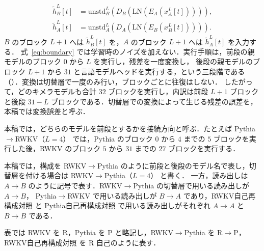 \documentclass[techrep,noauthor]{ipsj}
\newcommand{\rev}[1]{{\color{blue}#1}}
\newcommand{\revr}[1]{{\color{red}#1}}
\newcommand{\revp}[1]{{\color{violet}#1}}
\newcommand{\RWKVself}{\textsf{RWKV自己再構成対照}}
\newcommand{\Pythiaself}{\textsf{Pythia自己再構成対照}}
\newcommand{\RtoP}{\textsf{RWKV$\to$\allowbreak Pythia}}
\newcommand{\PtoR}{\textsf{Pythia$\to$\allowbreak RWKV}}
\newcommand{\RtoPL}[1]{\RtoP{}（$L{=}#1$）}
\newcommand{\PtoRL}[1]{\PtoR{}（$L{=}#1$）}
\begin{document}
\begin{equation}\label{eq:boundary}
\begin{aligned}
\widetilde h_B^L[t]
 &= \mathrm{unstd}_B^L\!\left(D_B\!\left(\mathrm{LN}(E_A(x_A^L[t]))\right)\right),\\
\widetilde h_A^L[t]
 &= \mathrm{unstd}_A^L\!\left(D_A\!\left(\mathrm{LN}(E_B(x_B^L[t]))\right)\right).
\end{aligned}
\end{equation}
$B$ のブロック $L{+}1$ へは $\widetilde h_B^L[t]$ を，$A$ のブロック $L{+}1$ へは $\widetilde h_A^L[t]$ を入力する．
式~\eqref{eq:boundary} では学習時のノイズを加えない．実行手順は，前段の親モデルのブロック $0$ から $L$ を実行し，残差を一度\rev{変換}し，
後段の親モデルのブロック $L{+}1$ から $31$ と言語モデルヘッドを実行する，という三段階である\rev{（）．変換は切替層で一度のみ行い，ブロックごとに往復はしない．}
したがって，どのキメラモデルも合計 $32$ ブロックを実行し，内訳は前段 $L{+}1$ ブロックと後段 $31{-}L$ ブロックである．\revr{切替層での変換によって生じる残差の誤差を，本稿では変換誤差と呼ぶ．}
\rev{本稿では，どちらのモデルを前段とするかを接続方向と呼ぶ．たとえば \PtoRL{4} では，Pythia のブロック $0$ から $4$ までの $5$ ブロックを実行した後，RWKV のブロック $5$ から $31$ までの
$27$ ブロックを実行する．

\rev{本稿}では，構成を \RtoP{} のように前段と後段のモデル名で表し，切替層を付ける場合は \RtoPL{4} と書く．
一方，\revr{読み出し}は $A\!\to\!B$ のように記号で表す．\RtoP{} の切替層で用いる読み出しが $A\!\to\!B$，
\PtoR{} で用いる\revp{読み出し}が $B\!\to\!A$ であり，\RWKVself{} と \Pythiaself{} で用いる読み出しがそれぞれ $A\!\to\!A$ と $B\!\to\!B$ である．}\rev{表では RWKV を \textsf{R}，Pythia を \textsf{P} と略記し，\RtoP{} を \textsf{R$\to$P}，\RWKVself{} を \textsf{R 自己}のように表す．}
\end{document}
